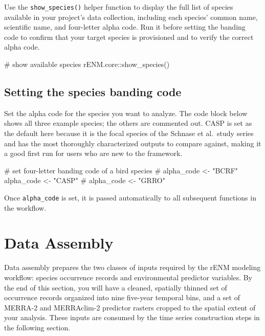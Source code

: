 \documentclass[
  letterpaper,
  DIV=11,
  numbers=noendperiod]{scrartcl}
\newenvironment{Shaded}{\begin{snugshade}}{\end{snugshade}}
\newcommand{\CommentTok}[1]{\textcolor[rgb]{0.37,0.37,0.37}{#1}}
\newcommand{\FunctionTok}[1]{\textcolor[rgb]{0.28,0.35,0.67}{#1}}
\newcommand{\NormalTok}[1]{\textcolor[rgb]{0.00,0.23,0.31}{#1}}
\newcommand{\OtherTok}[1]{\textcolor[rgb]{0.00,0.23,0.31}{#1}}
\newcommand{\SpecialCharTok}[1]{\textcolor[rgb]{0.37,0.37,0.37}{#1}}
\newcommand{\StringTok}[1]{\textcolor[rgb]{0.13,0.47,0.30}{#1}}
\begin{document}
Use the \texttt{show\_species()} helper function to display the full
list of species available in your project's data collection, including
each species' common name, scientific name, and four-letter alpha code.
Run it before setting the banding code to confirm that your target
species is provisioned and to verify the correct alpha code.

\begin{Shaded}
\begin{Highlighting}[]
\CommentTok{\# show available species}
\NormalTok{rENM.core}\SpecialCharTok{::}\FunctionTok{show\_species}\NormalTok{()}
\end{Highlighting}
\end{Shaded}

\subsection{Setting the species banding code}\label{bandingcode}

Set the alpha code for the species you want to analyze. The code block
below shows all three example species; the others are commented out.
CASP is set as the default here because it is the focal species of the
Schnase et al.~study series and has the most thoroughly characterized
outputs to compare against, making it a good first run for users who are
new to the framework.

\begin{Shaded}
\begin{Highlighting}[]
\CommentTok{\# set four{-}letter banding code of a bird species}
\CommentTok{\# alpha\_code \textless{}{-} "BCRF"}
\NormalTok{alpha\_code }\OtherTok{\textless{}{-}} \StringTok{"CASP"}
\CommentTok{\# alpha\_code \textless{}{-} "GRRO"}
\end{Highlighting}
\end{Shaded}

Once \texttt{alpha\_code} is set, it is passed automatically to all
subsequent functions in the workflow.

\section{Data Assembly}\label{data-assembly}

Data assembly prepares the two classes of inputs required by the rENM
modeling workflow: species occurrence records and environmental
predictor variables. By the end of this section, you will have a
cleaned, spatially thinned set of occurrence records organized into nine
five-year temporal bins, and a set of MERRA-2 and MERRAclim-2 predictor
rasters cropped to the spatial extent of your analysis. These inputs are
consumed by the time series construction steps in the following section.
\end{document}

